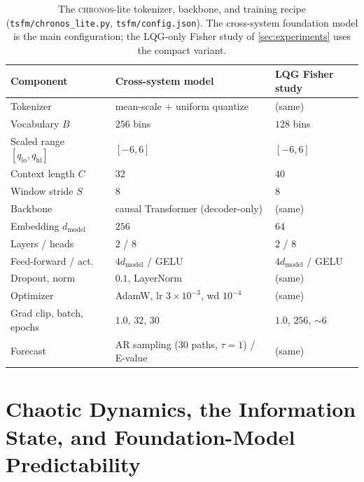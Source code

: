 \documentclass[10pt]{article}
\theoremstyle{plain}
\theoremstyle{definition}
\theoremstyle{remark}
\newcommand{\Chronos}{\textsc{chronos}}
\begin{document}
\begin{table}[t]
\centering\small
\setlength{\tabcolsep}{5pt}\renewcommand{\arraystretch}{1.18}
\caption{The \Chronos-lite tokenizer, backbone, and training recipe
(\texttt{tsfm/chronos\_lite.py}, \texttt{tsfm/config.json}). The cross-system
foundation model is the main configuration; the LQG-only Fisher study of
\cref{sec:experiments} uses the compact variant.}
\label{tab:tsfmarch}
\begin{tabular}{@{}lll@{}}
\toprule
Component & Cross-system model & LQG Fisher study\\
\midrule
Tokenizer & mean-scale $+$ uniform quantize & (same)\\
Vocabulary $B$ & $256$ bins & $128$ bins\\
Scaled range $[q_{\mathrm{lo}},q_{\mathrm{hi}}]$ & $[-6,6]$ & $[-6,6]$\\
Context length $C$ & $32$ & $40$\\
Window stride $S$ & $8$ & $8$\\
Backbone & causal Transformer (decoder-only) & (same)\\
Embedding $d_{\mathrm{model}}$ & $256$ & $64$\\
Layers / heads & $2$ / $8$ & $2$ / $8$\\
Feed-forward / act.\ & $4d_{\mathrm{model}}$ / GELU & $4d_{\mathrm{model}}$ / GELU\\
Dropout, norm & $0.1$, LayerNorm & (same)\\
Optimizer & AdamW, lr $3\!\times\!10^{-3}$, wd $10^{-4}$ & (same)\\
Grad clip, batch, epochs & $1.0$, $32$, $30$ & $1.0$, $256$, $\sim\!6$\\
Forecast & AR sampling ($30$ paths, $\tau{=}1$) / E-value & (same)\\
\bottomrule
\end{tabular}
\end{table}

\section{Chaotic Dynamics, the Information State, and Foundation-Model Predictability}
\label{sec:chaos}
\end{document}
